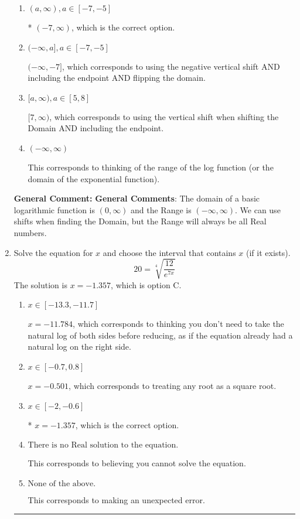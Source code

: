 \documentclass{extbook}[14pt]
\newcommand{\litem}[1]{\item #1

\rule{\textwidth}{0.4pt}}
\begin{document}
\begin{enumerate}
{\begin{enumerate}[label=\Alph*.]
$(-\infty, 7)$, which corresponds to flipping the Domain. Remember: the general for is $a*\log(x-h)+k$, \textbf{where $a$ does not affect the domain}.
\item \( (a, \infty), a \in [-7, -5] \)

* $(-7, \infty)$, which is the correct option.
\item \( (-\infty, a], a \in [-7, -5] \)

$(-\infty, -7]$, which corresponds to using the negative vertical shift AND including the endpoint AND flipping the domain.
\item \( [a, \infty), a \in [5, 8] \)

$[7, \infty)$, which corresponds to using the vertical shift when shifting the Domain AND including the endpoint.
\item \( (-\infty, \infty) \)

This corresponds to thinking of the range of the log function (or the domain of the exponential function).
\end{enumerate}

\textbf{General Comment:} \textbf{General Comments}: The domain of a basic logarithmic function is $(0, \infty)$ and the Range is $(-\infty, \infty)$. We can use shifts when finding the Domain, but the Range will always be all Real numbers.
}
\litem{
 Solve the equation for $x$ and choose the interval that contains $x$ (if it exists).
\[  20 = \sqrt[4]{\frac{12}{e^{7x}}} \]The solution is \( x = -1.357 \), which is option C.\begin{enumerate}[label=\Alph*.]
\item \( x \in [-13.3, -11.7] \)

$x = -11.784$, which corresponds to thinking you don't need to take the natural log of both sides before reducing, as if the equation already had a natural log on the right side.
\item \( x \in [-0.7, 0.8] \)

$x = -0.501$, which corresponds to treating any root as a square root.
\item \( x \in [-2, -0.6] \)

* $x = -1.357$, which is the correct option.
\item \( \text{There is no Real solution to the equation.} \)

This corresponds to believing you cannot solve the equation.
\item \( \text{None of the above.} \)

This corresponds to making an unexpected error.
\end{enumerate}

}
\end{enumerate}
\end{document}
